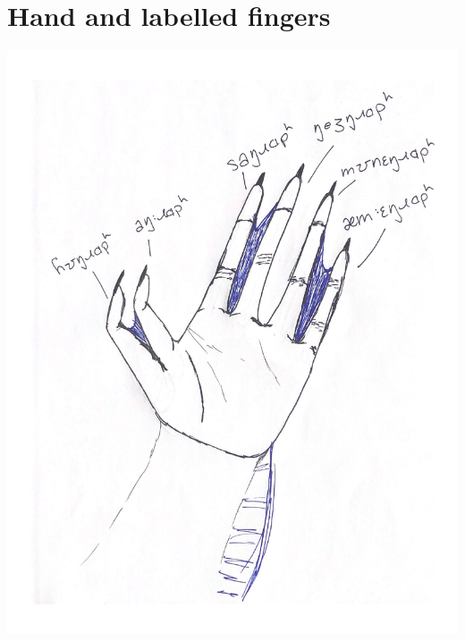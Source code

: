 \documentclass[11pt]{report}
\begin{document}
\chapter{Hand and labelled fingers}
\label{appendix:b}
\begin{center}
\includegraphics[scale=.7]{hand_doc.pdf}
\end{center}
\end{document}
